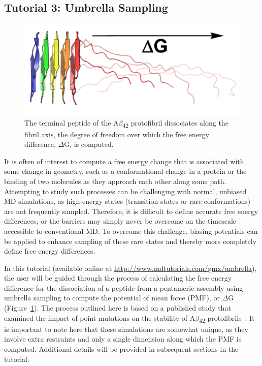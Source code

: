 \documentclass[9pt,tutorial,pubversion]{livecoms}
\newcommand{\urlstring}{http://www.mdtutorials.com/gmx}
\newcommand{\tutorialpmf}{\url{\urlstring/umbrella}}
\begin{document}
\subsection{Tutorial 3: Umbrella Sampling} \label{pmf}

\begin{figure}[H]
\centering
\includegraphics{umbrella_protofibril_dissociate}
\caption{The terminal peptide of the A$\beta$\textsubscript{42} protofibril dissociates along the fibril axis, the degree of freedom over which the free energy difference, $\Delta$G, is computed.}
\label{umbrella_composite_fig}
\end{figure}

It is often of interest to compute a free energy change that is associated with some change in geometry, such as a conformational change in a protein or the binding of two molecules as they approach each other along some path. Attempting to study such processes can be challenging with normal, unbiased MD simulations, as high-energy states (transition states or rare conformations) are not frequently sampled. Therefore, it is difficult to define accurate free energy differences, or the barriers may simply never be overcome on the timescale accessible to conventional MD. To overcome this challenge, biasing potentials can be applied to enhance sampling of these rare states and thereby more completely define free energy differences.

In this tutorial (available online at \tutorialpmf), the user will be guided through the process of calculating the free energy difference for the dissociation of a peptide from a pentameric assembly using umbrella sampling to compute the potential of mean force (PMF), or $\Delta$G (Figure~\ref{umbrella_composite_fig}). The process outlined here is based on a published study that examined the impact of point mutations on the stability of A$\beta$\textsubscript{42} protofibrils~\cite{Lemkul2010}. It is important to note here that these simulations are somewhat unique, as they involve extra restraints and only a single dimension along which the PMF is computed. Additional details will be provided in subsequent sections in the tutorial.
\end{document}
